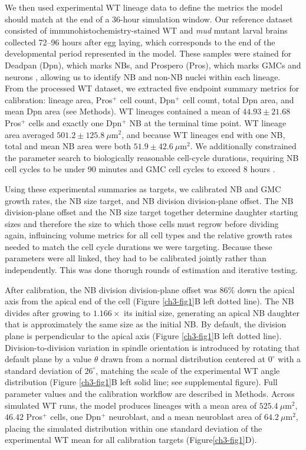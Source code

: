 We then used experimental WT lineage data to define the metrics the model should match at the end of a 36-hour simulation window.
Our reference dataset consisted of immunohistochemistry-stained WT and \textit{mud} mutant larval brains collected 72--96 hours after egg laying, which corresponds to the end of the developmental period represented in the model.
These samples were stained for Deadpan (Dpn), which marks NBs, and Prospero (Pros), which marks GMCs and neurons \cite{zhu_2012_bhlhrepressordeadpan, li_2000_panneuralprosperoterminates}, allowing us to identify NB and non-NB nuclei within each lineage.
From the processed WT dataset, we extracted five endpoint summary metrics for calibration: lineage area, Pros$^{+}$ cell count, Dpn$^{+}$ cell count, total Dpn area, and mean Dpn area (see Methods).
WT lineages contained a mean of $44.93 \pm 21.68$ Pros$^{+}$ cells and exactly one Dpn$^{+}$ NB at the terminal time point.
WT lineage area averaged $501.2 \pm 125.8~\mu\mathrm{m}^2$, and because WT lineages end with one NB, total and mean NB area were both $51.9 \pm 42.6~\mu\mathrm{m}^2$.
We additionally constrained the parameter search to biologically reasonable cell-cycle durations, requiring NB cell cycles to be under 90 minutes and GMC cell cycles to exceed 8 hours \cite{homem_2014_ecdysonemediatorchange, sillerNuMArelatedMudProtein2006}.

Using these experimental summaries as targets, we calibrated NB and GMC growth rates, the NB size target, and NB division division-plane offset.
The NB division-plane offset and the NB size target together determine daughter starting sizes and therefore the size to which those cells must regrow before dividing again, influincing volume metrics for all cell types and the relative growth rates needed to match the cell cycle durations we were targeting.
Because these parameters were all linked, they had to be calibrated jointly rather than independently.
This was done thorugh rounds of estimation and iterative testing.

After calibration, the NB division division-plane offset was $86\%$ down the apical axis from the apical end of the cell (Figure \ref{ch3-fig1}B left dotted line).
The NB divides after growing to $1.166\times$ its initial size, generating an apical NB daughter that is approximately the same size as the initial NB.
By default, the division plane is perpendicular to the apical axis (Figure \ref{ch3-fig1}B left dotted line).
Division-to-division variation in spindle orientation is introduced by rotating that default plane by a value $\theta$ drawn from a normal distribution centered at $0^\circ$ with a standard deviation of $26^\circ$, matching the scale of the experimental WT angle distribution (Figure \ref{ch3-fig1}B left solid line; see supplemental figure).
Full parameter values and the calibration workflow are described in Methods.
Across simulated WT runs, the model produces lineages with a mean area of $525.4~\mu\mathrm{m}^2$, $46.42$ Pros$^{+}$ cells, one Dpn$^{+}$ neuroblast, and a mean neuroblast area of $64.2~\mu\mathrm{m}^2$, placing the simulated distribution within one standard deviation of the experimental WT mean for all calibration targets (Figure\ref{ch3-fig1}D).

